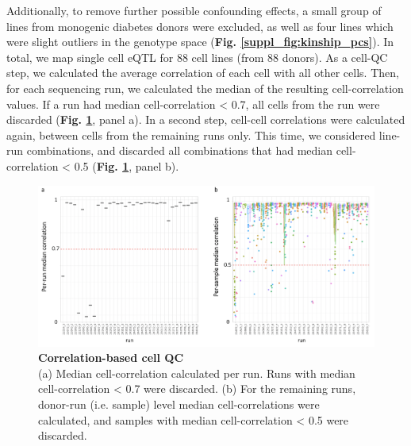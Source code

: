 Additionally, to remove further possible confounding effects, a small group of lines from monogenic diabetes donors were excluded, as well as four lines which were slight outliers in the genotype space (\textbf{Fig. \ref{suppl_fig:kinship_pcs}}).
In total, we map single cell eQTL for 88 cell lines (from 88 donors).
As a cell-QC step, we calculated the average correlation of each cell with all other cells.
Then, for each sequencing run, we calculated the median of the resulting cell-correlation values.
If a run had median cell-correlation < 0.7, all cells from the run were discarded (\textbf{Fig. \ref{fig:sc_eqtl_autocorrelation}}, panel a).
In a second step, cell-cell correlations were calculated again, between cells from the remaining runs only.
This time, we considered line-run combinations, and discarded all combinations that had median cell-correlation < 0.5 (\textbf{Fig. \ref{fig:sc_eqtl_autocorrelation}}, panel b). \\

\begin{figure}[h]
\centering
\includegraphics[width=15cm]{Chapter3/Fig/sc_eqtl_cell_QC.png}
\caption[Correlation-based cell QC]{\textbf{Correlation-based cell QC}\\
(a) Median cell-correlation calculated per run.
Runs with median cell-correlation < 0.7 were discarded.
(b) For the remaining runs, donor-run (i.e. sample) level median cell-correlations were calculated, and samples with median cell-correlation < 0.5 were discarded.}
\label{fig:sc_eqtl_autocorrelation}
\end{figure}

\newpage

